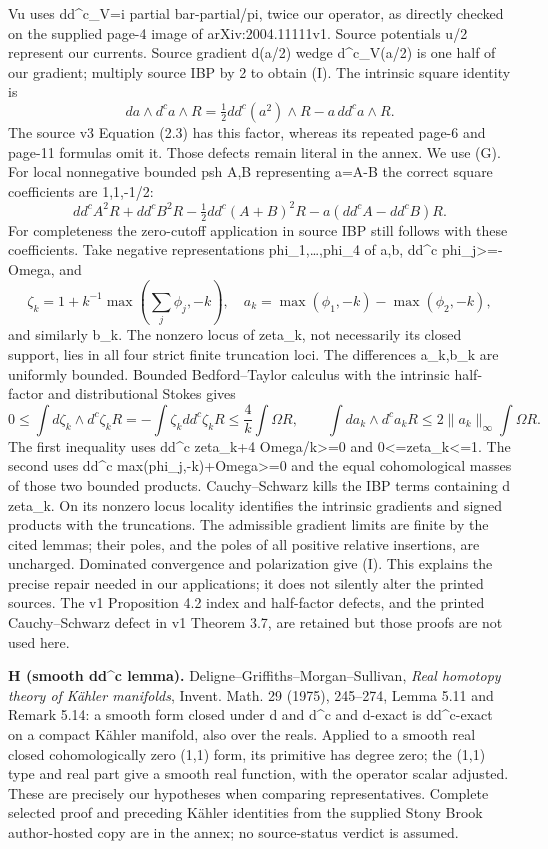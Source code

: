\documentclass[
]{article}
\begin{document}
Vu uses dd\^{}c\_V=i partial bar-partial/pi, twice our operator, as
directly checked on the supplied page-4 image of arXiv:2004.11111v1.
Source potentials u/2 represent our currents. Source gradient d(a/2)
wedge d\^{}c\_V(a/2) is one half of our gradient; multiply source IBP by
2 to obtain (I). The intrinsic square identity is \[
da\wedge d^ca\wedge R=\tfrac12dd^c(a^2)\wedge R-a\,dd^ca\wedge R.\tag{G}
\] The source v3 Equation (2.3) has this factor, whereas its repeated
page-6 and page-11 formulas omit it. Those defects remain literal in the
annex. We use (G). For local nonnegative bounded psh A,B representing
a=A-B the correct square coefficients are 1,1,-1/2: \[
dd^c A^2R+dd^c B^2R-\tfrac12dd^c(A+B)^2R-a(dd^cA-dd^cB)R.
\] For completeness the zero-cutoff application in source IBP still
follows with these coefficients. Take negative representations
phi\_1,\ldots,phi\_4 of a,b, dd\^{}c phi\_j\textgreater=-Omega, and \[
\zeta_k=1+k^{-1}\max(\textstyle\sum_j\phi_j,-k),\quad
a_k=\max(\phi_1,-k)-\max(\phi_2,-k),
\] and similarly b\_k. The nonzero locus of zeta\_k, not necessarily its
closed support, lies in all four strict finite truncation loci. The
differences a\_k,b\_k are uniformly bounded. Bounded Bedford--Taylor
calculus with the intrinsic half-factor and distributional Stokes gives
\[
0\leq\int d\zeta_k\wedge d^c\zeta_k R
=-\int\zeta_k dd^c\zeta_k R
\leq \frac4k\int\Omega R,
\qquad
\int da_k\wedge d^ca_k R\leq2\|a_k\|_\infty\int\Omega R.
\] The first inequality uses dd\^{}c zeta\_k+4 Omega/k\textgreater=0 and
0\textless=zeta\_k\textless=1. The second uses dd\^{}c
max(phi\_j,-k)+Omega\textgreater=0 and the equal cohomological masses of
those two bounded products. Cauchy--Schwarz kills the IBP terms
containing d zeta\_k. On its nonzero locus locality identifies the
intrinsic gradients and signed products with the truncations. The
admissible gradient limits are finite by the cited lemmas; their poles,
and the poles of all positive relative insertions, are uncharged.
Dominated convergence and polarization give (I). This explains the
precise repair needed in our applications; it does not silently alter
the printed sources. The v1 Proposition 4.2 index and half-factor
defects, and the printed Cauchy--Schwarz defect in v1 Theorem 3.7, are
retained but those proofs are not used here.

\textbf{H (smooth dd\^{}c lemma).} Deligne--Griffiths--Morgan--Sullivan,
\emph{Real homotopy theory of Kähler manifolds}, Invent. Math. 29
(1975), 245--274, Lemma 5.11 and Remark 5.14: a smooth form closed under
d and d\^{}c and d-exact is dd\^{}c-exact on a compact Kähler manifold,
also over the reals. Applied to a smooth real closed cohomologically
zero (1,1) form, its primitive has degree zero; the (1,1) type and real
part give a smooth real function, with the operator scalar adjusted.
These are precisely our hypotheses when comparing representatives.
Complete selected proof and preceding Kähler identities from the
supplied Stony Brook author-hosted copy are in the annex; no
source-status verdict is assumed.
\end{document}
